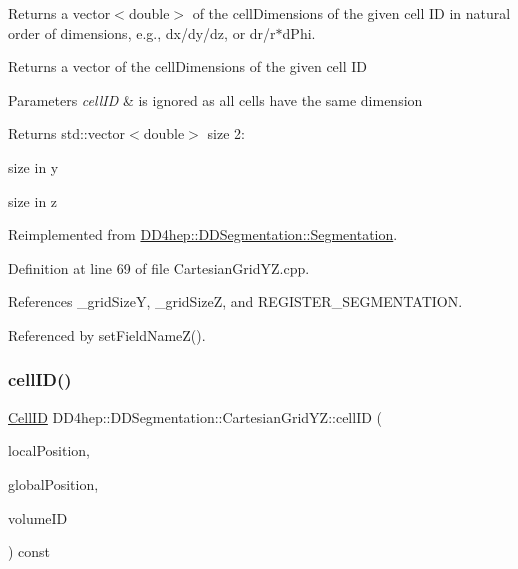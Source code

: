 Returns a vector$<$double$>$ of the cell\+Dimensions of the given cell ID in natural order of dimensions, e.\+g., dx/dy/dz, or dr/r$\ast$d\+Phi. 

Returns a vector of the cell\+Dimensions of the given cell ID 
\begin{DoxyParams}{Parameters}
{\em cell\+ID} & is ignored as all cells have the same dimension \\
\hline
\end{DoxyParams}
\begin{DoxyReturn}{Returns}
std\+::vector$<$double$>$ size 2\+:
\begin{DoxyEnumerate}
\item size in y
\item size in z 
\end{DoxyEnumerate}
\end{DoxyReturn}


Reimplemented from \hyperlink{class_d_d4hep_1_1_d_d_segmentation_1_1_segmentation_ac2119ba64c9805751e08b6100ef6fee6}{D\+D4hep\+::\+D\+D\+Segmentation\+::\+Segmentation}.



Definition at line 69 of file Cartesian\+Grid\+Y\+Z.\+cpp.



References \+\_\+grid\+SizeY, \+\_\+grid\+SizeZ, and R\+E\+G\+I\+S\+T\+E\+R\+\_\+\+S\+E\+G\+M\+E\+N\+T\+A\+T\+I\+ON.



Referenced by set\+Field\+Name\+Z().

\hypertarget{class_d_d4hep_1_1_d_d_segmentation_1_1_cartesian_grid_y_z_a20f6a732320e5d4b73643c3d8784ba7b}{}\label{class_d_d4hep_1_1_d_d_segmentation_1_1_cartesian_grid_y_z_a20f6a732320e5d4b73643c3d8784ba7b} 
\subsubsection{\texorpdfstring{cell\+I\+D()}{cellID()}}
{\footnotesize\ttfamily \hyperlink{namespace_d_d4hep_1_1_d_d_segmentation_ac7af071d85cb48820914434a07e21ba1}{Cell\+ID} D\+D4hep\+::\+D\+D\+Segmentation\+::\+Cartesian\+Grid\+Y\+Z\+::cell\+ID (\begin{DoxyParamCaption}\item[{const \hyperlink{struct_d_d4hep_1_1_d_d_segmentation_1_1_vector3_d}{Vector3D} \&}]{local\+Position,  }\item[{const \hyperlink{struct_d_d4hep_1_1_d_d_segmentation_1_1_vector3_d}{Vector3D} \&}]{global\+Position,  }\item[{const \hyperlink{namespace_d_d4hep_1_1_d_d_segmentation_a61a6833a18d1800bdef176595f83e3ba}{Volume\+ID} \&}]{volume\+ID }\end{DoxyParamCaption}) const\hspace{0.3cm}{\ttfamily [virtual]}}



